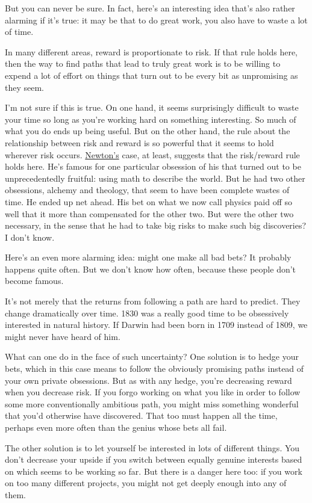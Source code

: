 But you can never be sure. In fact, here's an interesting idea that's
also rather alarming if it's true: it may be that to do great work, you
also have to waste a lot of time.

In many different areas, reward is proportionate to risk. If that rule
holds here, then the way to find paths that lead to truly great work is
to be willing to expend a lot of effort on things that turn out to be
every bit as unpromising as they seem.

I'm not sure if this is true. On one hand, it seems surprisingly
difficult to waste your time so long as you're working hard on something
interesting. So much of what you do ends up being useful. But on the
other hand, the rule about the relationship between risk and reward is
so powerful that it seems to hold wherever risk occurs.
\href{disc.html}{Newton's} case, at least, suggests that the risk/reward
rule holds here. He's famous for one particular obsession of his that
turned out to be unprecedentedly fruitful: using math to describe the
world. But he had two other obsessions, alchemy and theology, that seem
to have been complete wastes of time. He ended up net ahead. His bet on
what we now call physics paid off so well that it more than compensated
for the other two. But were the other two necessary, in the sense that
he had to take big risks to make such big discoveries? I don't know.

Here's an even more alarming idea: might one make all bad bets? It
probably happens quite often. But we don't know how often, because these
people don't become famous.

It's not merely that the returns from following a path are hard to
predict. They change dramatically over time. 1830 was a really good time
to be obsessively interested in natural history. If Darwin had been born
in 1709 instead of 1809, we might never have heard of him.

What can one do in the face of such uncertainty? One solution is to
hedge your bets, which in this case means to follow the obviously
promising paths instead of your own private obsessions. But as with any
hedge, you're decreasing reward when you decrease risk. If you forgo
working on what you like in order to follow some more conventionally
ambitious path, you might miss something wonderful that you'd otherwise
have discovered. That too must happen all the time, perhaps even more
often than the genius whose bets all fail.

The other solution is to let yourself be interested in lots of different
things. You don't decrease your upside if you switch between equally
genuine interests based on which seems to be working so far. But there
is a danger here too: if you work on too many different projects, you
might not get deeply enough into any of them.

